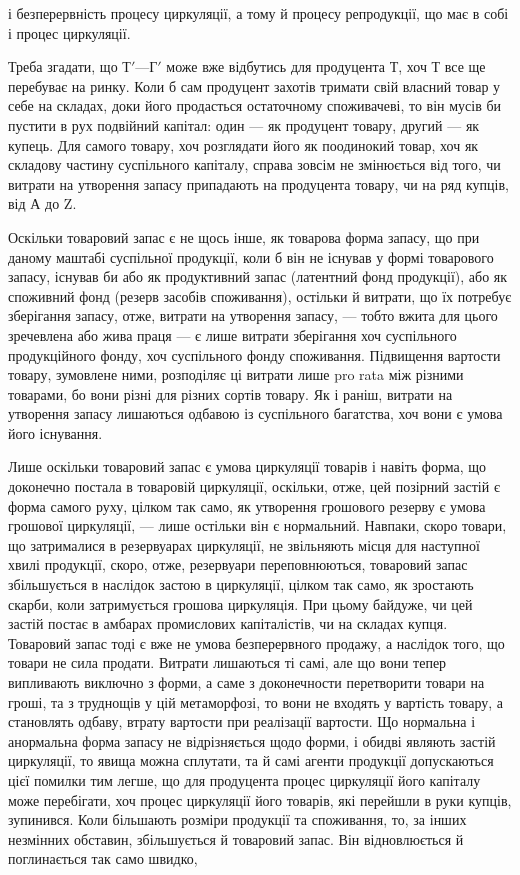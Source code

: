 \parcont{}  %
і безперервність процесу циркуляції, а тому й процесу репродукції, що
має в собі і процес циркуляції.

Треба згадати, що $Т' — Г'$ може вже відбутись для продуцента Т,
хоч Т все ще перебуває на ринку. Коли б сам продуцент захотів тримати
свій власний товар у себе на складах, доки його продасться остаточному
споживачеві, то він мусів би пустити в рух подвійний капітал:
один — як продуцент товару, другий — як купець. Для самого товару,
хоч розглядати його як поодинокий товар, хоч як складову частину
суспільного капіталу, справа зовсім не змінюється від того, чи витрати
на утворення запасу припадають на продуцента товару, чи на ряд купців,
від А до Z.

Оскільки товаровий запас є не щось інше, як товарова форма запасу,
що при даному маштабі суспільної продукції, коли б він не існував у
формі товарового запасу, існував би або як продуктивний запас (латентний
фонд продукції), або як споживний фонд (резерв засобів споживання),
остільки й витрати, що їх потребує зберігання запасу, отже, витрати на
утворення запасу, — тобто вжита для цього зречевлена або жива праця —
є лише витрати зберігання хоч суспільного продукційного фонду,
хоч суспільного фонду споживання. Підвищення вартости товару,
зумовлене ними, розподіляє ці витрати лише pro rata між різними
товарами, бо вони різні для різних сортів товару. Як і раніш,
витрати на утворення запасу лишаються одбавою із суспільного багатства,
хоч вони є умова його існування.

Лише оскільки товаровий запас є умова циркуляції товарів і навіть
форма, що доконечно постала в товаровій циркуляції, оскільки, отже,
цей позірний застій є форма самого руху, цілком так само, як утворення
грошового резерву є умова грошової циркуляції, — лише остільки
він є нормальний. Навпаки, скоро товари, що затрималися в резервуарах
циркуляції, не звільняють місця для наступної хвилі продукції,
скоро, отже, резервуари переповнюються, товаровий запас збільшується
в наслідок застою в циркуляції, цілком так само, як зростають
скарби, коли затримується грошова циркуляція. При цьому
байдуже, чи цей застій постає в амбарах промислових капіталістів, чи
на складах купця. Товаровий запас тоді є вже не умова безперервного
продажу, а наслідок того, що товари не сила продати. Витрати лишаються
ті самі, але що вони тепер випливають виключно з форми, а саме з
доконечности перетворити товари на гроші, та з труднощів у цій метаморфозі,
то вони не входять у вартість товару, а становлять одбаву, втрату
вартости при реалізації вартости. Що нормальна і анормальна форма
запасу не відрізняється щодо форми, і обидві являють застій циркуляції,
то явища можна сплутати, та й самі агенти продукції допускаються
цієї помилки тим легше, що для продуцента процес циркуляції
його капіталу може перебігати, хоч процес циркуляції його товарів,
які перейшли в руки купців, зупинився. Коли більшають розміри
продукції та споживання, то, за інших незмінних обставин, збільшується
й товаровий запас. Він відновлюється й поглинається так само швидко,
\parbreak{}  %
